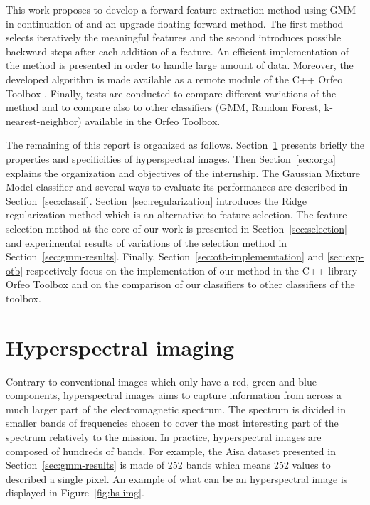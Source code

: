 \documentclass[a4paper,11pt,DIV=16,abstracton]{scrartcl}
\begin{document}
This work proposes to develop a forward feature extraction method using GMM in continuation of \cite{fauvel2015fast} and an upgrade floating forward method. The first method selects iteratively the meaningful features and the second introduces possible backward steps after each addition of a feature. An efficient implementation of the method is presented in order to handle large amount of data. Moreover, the developed algorithm is made available as a remote module of the C++ Orfeo Toolbox \cite{christophe2008orfeo}. Finally, tests are conducted to compare different variations of the method and to compare also to other classifiers (GMM, Random Forest, k-nearest-neighbor) available in the Orfeo Toolbox.

The remaining of this report is organized as follows. Section~\ref{sec:hs-img} presents briefly the properties and specificities of hyperspectral images. Then Section~\ref{sec:orga} explains the organization and objectives of the internship. The Gaussian Mixture Model classifier and several ways to evaluate its performances are described in Section~\ref{sec:classif}. Section~\ref{sec:regularization} introduces the Ridge regularization method which is an alternative to feature selection. The feature selection method at the core of our work is presented in Section~\ref{sec:selection} and experimental results of variations of the selection method in Section~\ref{sec:gmm-results}. Finally, Section~\ref{sec:otb-implememtation} and \ref{sec:exp-otb} respectively focus on the implementation of our method in the C++ library Orfeo Toolbox and on the comparison of our classifiers to other classifiers of the toolbox.

\section{Hyperspectral imaging}
\label{sec:hs-img}

Contrary to conventional images which only have a red, green and blue components, hyperspectral images aims to capture information from across a much larger part of the electromagnetic spectrum. The spectrum is divided in smaller bands of frequencies chosen to cover the most interesting part of the spectrum relatively to the mission. In practice, hyperspectral images are composed of hundreds of bands. For example, the Aisa dataset presented in Section~\ref{sec:gmm-results} is made of 252 bands which means 252 values to described a single pixel. An example of what can be an hyperspectral image is displayed in Figure~\ref{fig:hs-img}.
\end{document}
